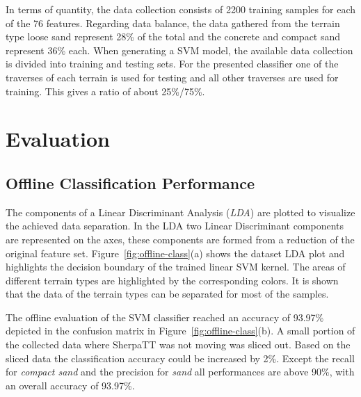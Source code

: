 \documentclass{article}
\begin{document}
In terms of quantity, the data collection consists of 2200 training samples for each of the 76 features. 
Regarding data balance, the data gathered from the terrain type loose sand represent 28\% of the total and the concrete and compact sand represent 36\% each. 
When generating a SVM model, the available data collection is divided into training and testing sets. 
For the presented classifier one of the traverses of each terrain is used for testing and all other traverses are used for training. 
This gives a ratio of about 25\%/75\%.

\section{Evaluation}
\subsection{Offline Classification Performance}

The components of a Linear Discriminant Analysis (\emph{LDA}) are plotted to visualize the achieved data separation. 
In the LDA two Linear Discriminant components are represented on the axes, these components are formed from a reduction of the original feature set.
Figure~\ref{fig:offline-class}(a) shows the dataset LDA plot and highlights the decision boundary of the trained linear SVM kernel. 
The areas of different terrain types are highlighted by the corresponding colors. 
It is shown that the data of the terrain types can be separated for most of the samples.

The offline evaluation of the SVM classifier reached an accuracy of 93.97\% depicted in the confusion matrix in Figure~\ref{fig:offline-class}(b). 
A small portion of the collected data where SherpaTT was not moving was sliced out. 
Based on the sliced data the classification accuracy could be increased by 2\%.
Except the recall for \emph{compact sand} and the precision for \emph{sand} all performances are above 90\%, with an overall accuracy of 93.97\%.
\end{document}
